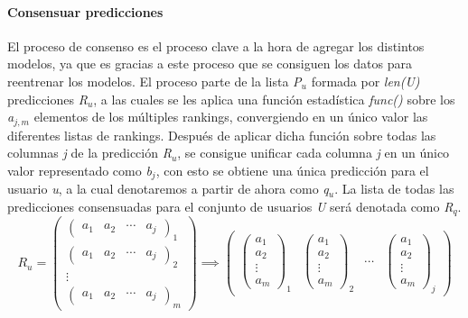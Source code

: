 \paragraph{Consensuar predicciones} \label{Consensuar_predicciones} El proceso de consenso es el proceso clave a la hora de agregar los distintos modelos, ya que es gracias a este proceso que se consiguen los datos para reentrenar los modelos. El proceso parte de la lista \textit{P$_{u}$} formada por \textit{len(U)} predicciones \textit{R$_{u}$}, a las cuales se les aplica una función estadística \textit{func()} sobre los \textit{a$_{j, m}$} elementos de los múltiples rankings, convergiendo en un único valor las diferentes listas de rankings. Después de aplicar dicha función sobre todas las columnas \textit{j} de la predicción \textit{R$_{u}$}, se consigue unificar cada columna \textit{j} en un único valor representado como \textit{b$_{j}$}, con esto se obtiene una única predicción para el usuario \textit{u}, a la cual denotaremos a partir de ahora como \textit{q$_{u}$}. La lista de todas las predicciones consensuadas para el conjunto de usuarios \textit{U} será denotada como \textit{R$_{q}$}.
\[  \textit{R$_{u}$}=
    \begin{pmatrix}
        \begin{pmatrix} a_{1}  &  a_{2}  &  \cdots   & a_{j} \end{pmatrix}_{1} \\ 
        \begin{pmatrix} a_{1}  &  a_{2}  &  \cdots   & a_{j} \end{pmatrix}_{2} \\ 
        \vdots \\ 
        \begin{pmatrix} a_{1}  &  a_{2}  &  \cdots   & a_{j} \end{pmatrix}_{m}
    \end{pmatrix}
    \implies
    \begin{pmatrix}
        \begin{pmatrix} a_{1}  \\  a_{2}  \\  \vdots   \\ a_{m} \end{pmatrix}_{1} & 
        \begin{pmatrix} a_{1}  \\  a_{2}  \\  \vdots   \\ a_{m} \end{pmatrix}_{2} & 
        \cdots &
        \begin{pmatrix} a_{1}  \\  a_{2}  \\  \vdots   \\ a_{m} \end{pmatrix}_{j}
    \end{pmatrix}    
\]
